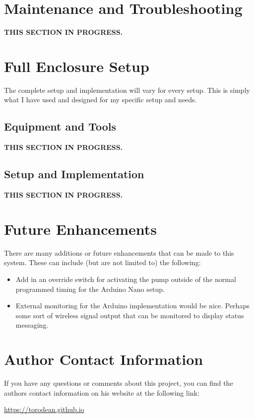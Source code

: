 \documentclass{article}
\begin{document}
\begin{multicols}{2}
		\section{Maintenance and Troubleshooting}
		\textbf{THIS SECTION IN PROGRESS.}
		
		\section{Full Enclosure Setup}		
		The complete setup and implementation will vary for every setup. This is simply what I have used and designed for my specific setup and needs.
		
			\subsection{Equipment and Tools}
			\textbf{THIS SECTION IN PROGRESS.}
			
			\subsection{Setup and Implementation}
			\textbf{THIS SECTION IN PROGRESS.}
		
		\section{Future Enhancements}
		There are many additions or future enhancements that can be made to this system. These can include (but are not limited to) the following:
		\begin{itemize}
			\item Add in an override switch for activating the pump outside of the normal programmed timing for the Arduino Nano setup.
			\item External monitoring for the Arduino implementation would be nice. Perhaps some sort of wireless signal output that can be monitored to display status messaging.
		\end{itemize}
		
		\section{Author Contact Information}
		
		If you have any questions or comments about this project, you can find the authors contact information on his website at the following link:
		
		\begin{mdframed}[backgroundcolor=gray!08, linewidth=1pt]
			\url{https://torodean.github.io}
		\end{mdframed}
		
	\end{multicols} %
	
\end{document}
